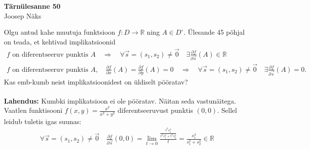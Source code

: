 \documentclass{article}
\begin{document}
\begin{center}
\Large\textbf{Tärnülesanne 50}\\
\small{Joosep Näks}
\end{center}
Olgu antud kahe muutuja funktsioon $f:D\to\mathbb{R}$ ning $A\in D^\circ$. Ülesande 45 põhjal on teada, et kehtivad implikatsioonid
\begin{gather*}
f\text{ on diferentseeruv punktis }A\quad\Rightarrow\quad \forall \vec{s}=(s_1,s_2)\neq \vec0\quad \exists\frac{\partial f}{\partial\vec s}(A)\in\mathbb{R}\\
f\text{ on diferentseeruv punktis }A,\quad\frac{\partial f}{\partial x}(A)=\frac{\partial f}{\partial y}(A)=0\quad\Rightarrow\quad \forall \vec{s}=(s_1,s_2)\neq \vec0\quad \exists\frac{\partial f}{\partial\vec s}(A)=0.
\end{gather*}
Kas emb-kumb neist implikatsioonidest on üldiselt pööratav?\\\\
\textbf{Lahendus:}
Kumbki implikatsioon ei ole pööratav. Näitan seda vastunäitega. Vaatlen funktisooni $f(x,y)=\frac{x^3}{x^2+y^2}$ diferentseeruvust punktis $(0,0)$. Sellel leidub tuletis igas suunas:
\begin{gather*}
\forall\vec{s}=(s_1,s_2)\neq\vec0\quad \frac{\partial f}{\partial\vec s}(0,0)=\lim_{t\to0}\frac{\frac{t^3s_1^3}{t^2s_1^2+t^2s_2^2}}{t}=\frac{s_1^3}{s_1^2+s_2^2}\in\mathbb{R}
\end{gather*}
\end{document}
